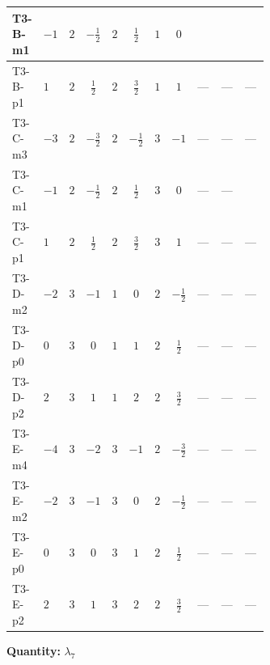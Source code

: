\documentclass[8pt]{article}
\begin{document}
\begin{landscape}
\begin{longtable}{@{}llcccccc >{\raggedright\arraybackslash}p{0.21\linewidth} >{\raggedright\arraybackslash}p{0.21\linewidth} >{\raggedright\arraybackslash}p{0.21\linewidth}@{}}
\midrule
T3-B-m1 & $-1$ & $2$ & $-\frac{1}{2}$ & $2$ & $\frac{1}{2}$ & $1$ & $0$ & \scriptsize\adjustbox{max width=\linewidth}{$\begin{gathered} {\lambda_{7}} (2 T_{\nu}^{(1)}+6 \operatorname{Tr}\!\left({Y_d}\,\left({Y_d}\right)^{\dagger}\right)+2 \operatorname{Tr}\!\left({Y_e}\,\left({Y_e}\right)^{\dagger}\right)+6 \operatorname{Tr}\!\left({Y_u}\,\left({Y_u}\right)^{\dagger}\right))\end{gathered}$} & \scriptsize\adjustbox{max width=\linewidth}{$\begin{gathered} +\left({\lambda_5}\right)^{*} \operatorname{Tr}\!\left({y_2}\,\left({y_1}\right)^{\dagger}\right)\end{gathered}$} & \scriptsize\adjustbox{max width=\linewidth}{$\begin{gathered} -2 {\lambda_{H H^\dagger S_1^\dagger S_2^\dagger}^{\rm Cross}} \left({\lambda_5}\right)^{*}\end{gathered}$} \\
\midrule
T3-B-p1 & $1$ & $2$ & $\frac{1}{2}$ & $2$ & $\frac{3}{2}$ & $1$ & $1$ & --- & --- & --- \\
\midrule
T3-C-m3 & $-3$ & $2$ & $-\frac{3}{2}$ & $2$ & $-\frac{1}{2}$ & $3$ & $-1$ & --- & --- & --- \\
\midrule
T3-C-m1 & $-1$ & $2$ & $-\frac{1}{2}$ & $2$ & $\frac{1}{2}$ & $3$ & $0$ & --- & --- & \scriptsize\adjustbox{max width=\linewidth}{$\begin{gathered} -2 {\lambda_{H H^\dagger S_1^\dagger S_2^\dagger}^{\rm Cross}} \left({\lambda_5}\right)^{*}\end{gathered}$} \\
\midrule
T3-C-p1 & $1$ & $2$ & $\frac{1}{2}$ & $2$ & $\frac{3}{2}$ & $3$ & $1$ & --- & --- & --- \\
\midrule
T3-D-m2 & $-2$ & $3$ & $-1$ & $1$ & $0$ & $2$ & $-\frac{1}{2}$ & --- & --- & --- \\
\midrule
T3-D-p0 & $0$ & $3$ & $0$ & $1$ & $1$ & $2$ & $\frac{1}{2}$ & --- & --- & --- \\
\midrule
T3-D-p2 & $2$ & $3$ & $1$ & $1$ & $2$ & $2$ & $\frac{3}{2}$ & --- & --- & --- \\
\midrule
T3-E-m4 & $-4$ & $3$ & $-2$ & $3$ & $-1$ & $2$ & $-\frac{3}{2}$ & --- & --- & --- \\
\midrule
T3-E-m2 & $-2$ & $3$ & $-1$ & $3$ & $0$ & $2$ & $-\frac{1}{2}$ & --- & --- & --- \\
\midrule
T3-E-p0 & $0$ & $3$ & $0$ & $3$ & $1$ & $2$ & $\frac{1}{2}$ & --- & --- & --- \\
\midrule
T3-E-p2 & $2$ & $3$ & $1$ & $3$ & $2$ & $2$ & $\frac{3}{2}$ & --- & --- & --- \\
\midrule
\bottomrule
\end{longtable}
\clearpage
\noindent\textbf{Quantity: }$\lambda_{7}$\par\smallskip

\end{landscape}
\end{document}
